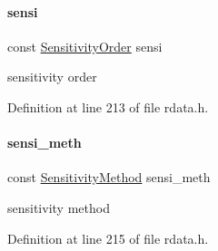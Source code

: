 \mbox{\label{classamici_1_1_return_data_ae273fd99697cf0308e7471d822c22d7f}} 
\paragraph{\texorpdfstring{sensi}{sensi}}
{\footnotesize\ttfamily const \mbox{\hyperlink{namespaceamici_aaa03ec2f8c4d5323b98d71134a462fda}{Sensitivity\+Order}} sensi}

sensitivity order 

Definition at line 213 of file rdata.\+h.

\mbox{\label{classamici_1_1_return_data_ab761d3023398d7f741a0cfc342dc29f5}} 
\paragraph{\texorpdfstring{sensi\+\_\+meth}{sensi\_meth}}
{\footnotesize\ttfamily const \mbox{\hyperlink{namespaceamici_aa0fa493529f6872e7e776b91fbbf38f9}{Sensitivity\+Method}} sensi\+\_\+meth}

sensitivity method 

Definition at line 215 of file rdata.\+h.

